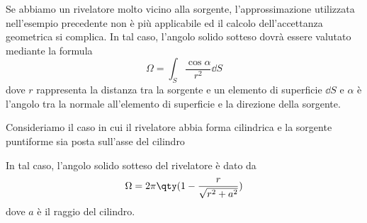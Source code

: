 \begin{esempio}\label{es:angolo_solido_riv_cilindro}
   Se abbiamo un rivelatore molto vicino alla sorgente, l'approssimazione utilizzata nell'esempio precedente non è più applicabile ed il calcolo dell'accettanza geometrica si complica. In tal caso, l'angolo solido sotteso dovrà essere valutato mediante la formula
   \begin{equation*}
      \Omega=\int_S \frac{\cos{\alpha}}{r^2} \dd{S}
   \end{equation*}
   dove $r$ rappresenta la distanza tra la sorgente e un elemento di superficie $\dd{S}$ e $\alpha$ è l'angolo tra la normale all'elemento di superficie e la direzione della sorgente.
   
   Consideriamo il caso in cui il rivelatore abbia forma cilindrica e la sorgente puntiforme sia posta sull'asse del cilindro
   \begin{figure}[H]
      \centering
   \end{figure}
   In tal caso, l'angolo solido sotteso del rivelatore è dato da
  \begin{equation*}
      \Omega=2\pi \qty( 1 - \frac{r}{\sqrt{r^2 + a^2}} )
  \end{equation*}
  dove $a$ è il raggio del cilindro.
\end{esempio}

